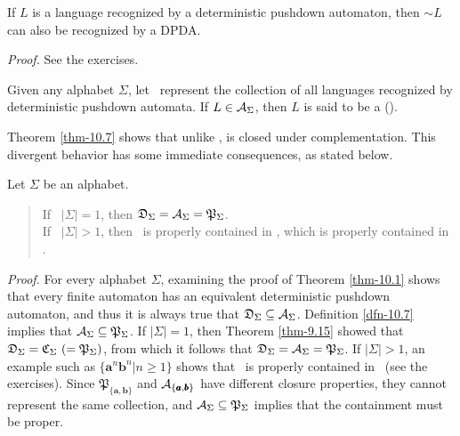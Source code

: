 \begin{thm}\label{thm-10.7}
If $L$ is a language recognized by a deterministic pushdown automaton, then
$\sim  L$ can also be recognized by a DPDA.

\emph{Proof.} See the exercises.
\end{thm}

\begin{dfn}\label{dfn-10.9}
Given any alphabet $\Sigma$, let \ASIG\ represent the collection of all languages
recognized by deterministic pushdown automata. If $L\in\mathcal{A}_\Sigma$, then $L$ is said
to be a \emph{} ().
\end{dfn}

Theorem \ref{thm-10.7} shows that unlike \PSIG, \ASIG is closed under complementation.
This divergent behavior has some immediate consequences, as stated below.

\begin{thm}\label{thm-10.8}
Let $\Sigma$ be an alphabet.
\begin{quote}
If \ $|\Sigma|=1$, then $\mathfrak{D}_\Sigma = \mathcal{A}_\Sigma = \mathfrak{P}_\Sigma$. \\
If \ $|\Sigma|>1$, then \DSIG\ is properly contained in \ASIG, which is properly
contained in \PSIG.
\end{quote}

\emph{Proof.} For every alphabet $\Sigma$, examining the proof of Theorem \ref{thm-10.1}
shows that every finite automaton has an equivalent deterministic pushdown
automaton, and thus it is always true that $\mathfrak{D}_\Sigma\subseteq\mathcal{A}_\Sigma$. Definition
\ref{dfn-10.7} implies that $\mathcal{A}_\Sigma\subseteq\mathfrak{P}_\Sigma$. If $|\Sigma|=1$, then Theorem \ref{thm-9.15}
showed that $\mathfrak{D}_\Sigma = \mathfrak{C}_\Sigma\  ( = \mathfrak{P}_\Sigma)$, from which it follows that $\mathfrak{D}_\Sigma =
\mathcal{A}_\Sigma = \mathfrak{P}_\Sigma$. If  $|\Sigma|>1$, an example such as $\{\pmb{a}^n\pmb{b}^n| n\geq
1\}$ shows that \DSIG\ is properly contained in \ASIG\ (see the exercises).
Since $\mathfrak{P}_{\{\pmb{a},\pmb{b}\}}$ and $\cal{A}_{\{\pmb{a},
\pmb{b}\}}$ have different closure properties, they cannot represent the same
collection, and $\mathcal{A}_\Sigma\subseteq\mathfrak{P}_\Sigma$ implies that the containment must be
proper.
\end{thm}

